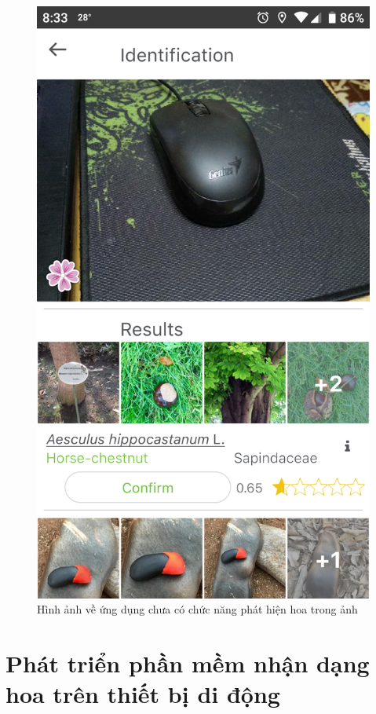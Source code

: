 \documentclass[12pt]{report}
\begin{document}
\begin{figure}[h]
			\includegraphics[scale=0.13]{app_detect2}
			\caption{Hình ảnh về ứng dụng chưa có chức năng phát hiện hoa trong ảnh}
			\label{fig:app_detect}
		\end{figure}
														
																
		\newpage
		\chapter{Phát triển phần mềm nhận dạng hoa trên thiết bị di động}
		\label{chap:solution}
												
\end{document}
